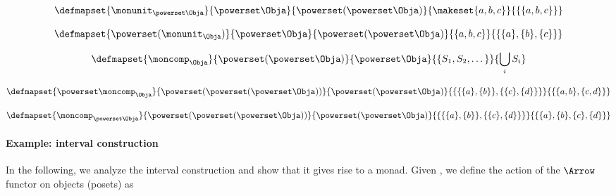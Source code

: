 {\begin{forslides}
		\begin{equation}
			\label{eq:monad-power-monunit-power}
			\defmapset{
				\monunit_{\powerset \Obja}
			}{
				\powerset \Obja
			}{
				\powerset (\powerset\Obja)
			}{
				\makeset{a, b, c}
			}{
				\{ \{a, b, c \} \}
			}
		\end{equation}

		\begin{equation}
			\label{eq:monad-power-power-monunit}
			\defmapset{
				\powerset(\monunit_\Obja)
			}{
				\powerset \Obja
			}{
				\powerset (\powerset\Obja)
			}{
				\{a, b, c\}
			}{
				\{ \{a\}, \{ b\}, \{c\} \}
			}
		\end{equation}

		\begin{equation}
			\label{eq:monad-power-moncomp}
			\defmapset{
				\moncomp_{\Obja}
			}{
				\powerset (\powerset\Obja)
			}{
				\powerset \Obja
			}{
				\{S_1, S_2, \dots \}
			}{
				\bigcup_i S_i
			}
		\end{equation}

		\begin{equation}
			\label{eq:monad-power-power-moncomp}
			\defmapset{
				\powerset \moncomp_{\Obja}
			}{
				\powerset (\powerset (\powerset\Obja))
			}{
				\powerset (\powerset \Obja)
			}{
				\{  \{   \{a\}, \{b\} \} , \{ \{c\}, \{d\} \}\}
			}{
				\{  \{ a, b \}, \{ c, d \} \}
			}
		\end{equation}

		\begin{equation}
			\label{eq:monad-power-moncomp-power}
			\defmapset{
				\moncomp_{\powerset \Obja}
			}{
				\powerset (\powerset (\powerset\Obja))
			}{
				\powerset (\powerset \Obja)
			}{
				\{  \{   \{a\}, \{b\} \} , \{ \{c\}, \{d\} \}\}
			}{
				\{    \{a\}, \{b\}  ,  \{c\}, \{d\}  \}
			}
		\end{equation}
	\end{forslides}
}

\paragraph*{Example: interval construction}
In the following, we analyze the interval construction and show that it gives rise to a monad.
Given \Pos, we define the action of the $\Arrow$ functor on objects (posets) as

